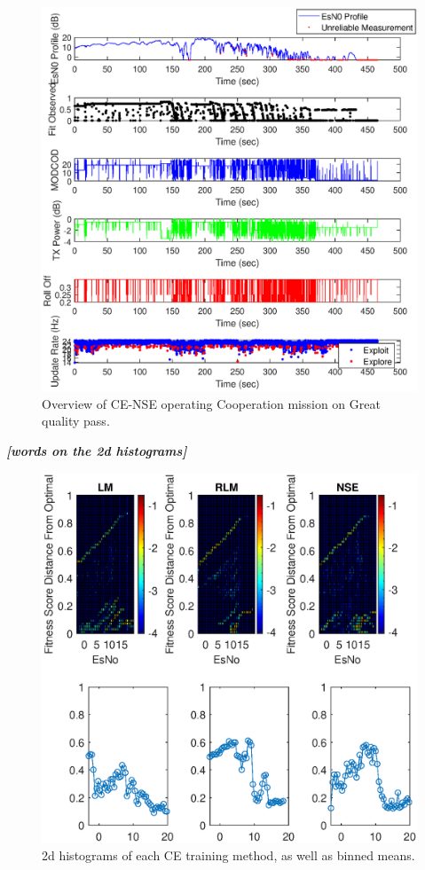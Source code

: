 \begin{figure}[ht]
\centering
\includegraphics[width=\textwidth]{figures/flight_results/coop_great_nse_overview.eps}
\caption{Overview of CE-NSE operating Cooperation mission on Great quality pass.}
\label{fig:flight_nse_coop_great_overview}
\end{figure}


\par \textbf{\textit{[words on the 2d histograms]}}

\begin{figure}[ht]
\centering
\includegraphics[width=\textwidth]{figures/flight_results/coop_great_2dhist.eps}
\caption{2d histograms of each CE training method, as well as binned means.}
\label{fig:coop_great_2dhist}
\end{figure}


